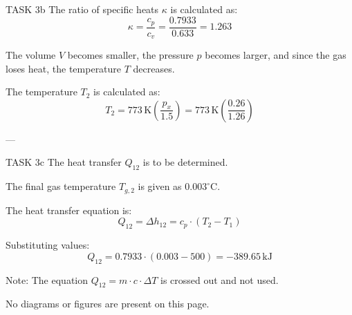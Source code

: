 TASK 3b  
The ratio of specific heats \( \kappa \) is calculated as:  
\[
\kappa = \frac{c_p}{c_v} = \frac{0.7933}{0.633} = 1.263
\]  

The volume \( V \) becomes smaller, the pressure \( p \) becomes larger, and since the gas loses heat, the temperature \( T \) decreases.  

The temperature \( T_2 \) is calculated as:  
\[
T_2 = 773 \, \text{K} \left( \frac{p_x}{1.5} \right) = 773 \, \text{K} \left( \frac{0.26}{1.26} \right)
\]  

---

TASK 3c  
The heat transfer \( Q_{12} \) is to be determined.  

The final gas temperature \( T_{g,2} \) is given as \( 0.003^\circ \text{C} \).  

The heat transfer equation is:  
\[
Q_{12} = \Delta h_{12} = c_p \cdot (T_2 - T_1)
\]  

Substituting values:  
\[
Q_{12} = 0.7933 \cdot (0.003 - 500) = -389.65 \, \text{kJ}
\]  

Note: The equation \( Q_{12} = m \cdot c \cdot \Delta T \) is crossed out and not used.  

No diagrams or figures are present on this page.
